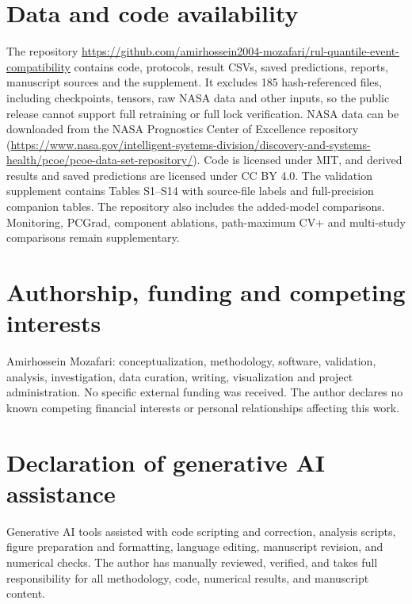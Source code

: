 \documentclass[IJPHM, 2026, 0]{phmsociety}
\begin{document}
\section*{Data and code availability}

The repository \url{https://github.com/amirhossein2004-mozafari/rul-quantile-event-compatibility} contains code, protocols, result CSVs, saved predictions, reports, manuscript sources and the supplement. It excludes \mbox{185} hash-referenced files, including checkpoints, tensors, raw NASA data and other inputs, so the public release cannot support full retraining or full lock verification. NASA data can be downloaded from the NASA Prognostics Center of Excellence repository (\url{https://www.nasa.gov/intelligent-systems-division/discovery-and-systems-health/pcoe/pcoe-data-set-repository/}). Code is licensed under MIT, and derived results and saved predictions are licensed under CC BY 4.0. The validation supplement contains Tables S1--S14 with source-file labels and full-precision companion tables. The repository also includes the added-model comparisons. Monitoring, PCGrad, component ablations, path-maximum CV+ and multi-study comparisons remain supplementary.

\section*{Authorship, funding and competing interests}

Amirhossein Mozafari: conceptualization, methodology, software, validation, analysis, investigation, data curation, writing, visualization and project administration. No specific external funding was received. The author declares no known competing financial interests or personal relationships affecting this work.

\section*{Declaration of generative AI assistance}

Generative AI tools assisted with code scripting and correction, analysis scripts, figure preparation and formatting, language editing, manuscript revision, and numerical checks. The author has manually reviewed, verified, and takes full responsibility for all methodology, code, numerical results, and manuscript content.

\clearpage

\end{document}
